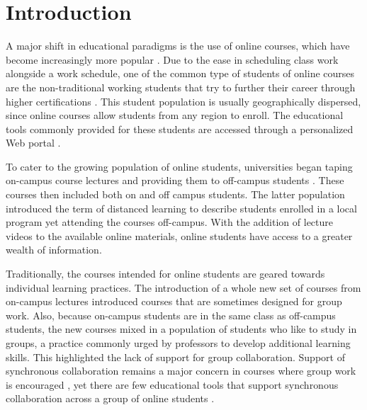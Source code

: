 \documentclass{sig-alternate}
\begin{document}



\section{Introduction}
A major shift in educational paradigms is the use of online courses,
which have become increasingly more popular \cite{BELLER,DOE}.  Due to
the ease in scheduling class work alongside a work schedule, one of
the common type of students of online courses are the non-traditional
working students that try to further their career through higher
certifications \cite{BURGESS}.  This student population is usually
geographically dispersed, since online courses allow students from any
region to enroll.  The educational tools commonly provided for these
students are accessed through a personalized Web portal
\cite{PHOENIX,CAPELLA}.

To cater to the growing population of online students, universities
began taping on-campus course lectures and providing them to
off-campus students \cite{CVN, STANDFORD}.  These courses then
included both on and off campus students.  The latter population
introduced the term of distanced learning to describe students
enrolled in a local program yet attending the courses off-campus.
With the addition of lecture videos to the available online materials,
online students have access to a greater wealth of information.

Traditionally, the courses intended for online students are geared
towards individual learning practices.  The introduction of a whole
new set of courses from on-campus lectures introduced courses that are
sometimes designed for group work.  Also, because on-campus students
are in the same class as off-campus students, the new courses mixed in
a population of students who like to study in groups, a practice
commonly urged by professors to develop additional learning skills.
This highlighted the lack of support for group collaboration.  Support
of synchronous collaboration remains a major concern in courses where
group work is encouraged \cite{WELLS}, yet there are few educational
tools that support synchronous collaboration across a group of online
students \cite{BURGESS}.
\end{document}
